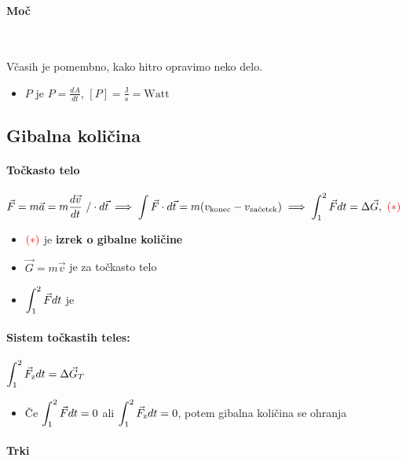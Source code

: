 \paragraph{Moč} \ 

Včasih je pomembno, kako hitro opravimo neko delo.

\begin{itemize}
    \item {} \(P\) je \(P = \frac{dA}{dt}\), \([P] = \frac{\text{J}}{\text{s}} = \text{Watt}\)
\end{itemize}

\subsection{Gibalna količina}
\paragraph{Točkasto telo}
\[\vec{F} = m \vec{a} = m \frac{d \vec{v}}{dt} \ / \cdot d \vec{t} \implies \int \vec{F} \cdot d \vec{t} = m(v_\text{konec} - v_\text{začetek}) \implies \int_{1}^{2}  \vec{F} dt = \Delta \vec{G}, \ \textcolor{red}{(*)}\]
\begin{itemize}
    \item \(\textcolor{red}{(*)}\) je \textbf{izrek o gibalne količine}
    \item \(\vec{G} = m \vec{v}\) je  za točkasto telo
    \item \(\displaystyle \int_{1}^{2} \vec{F} dt\) je 
\end{itemize}

\paragraph{Sistem točkastih teles: } \(\displaystyle \int_{1}^{2} \vec{F}_\text{z} dt = \Delta \vec{G}_T\)

\begin{itemize}
    \item Če \(\displaystyle \int_{1}^{2} \vec{F} dt = 0\) ali \(\displaystyle \int_{1}^{2} \vec{F}_\text{z} dt = 0\), potem gibalna količina se ohranja
\end{itemize}

\paragraph{Trki} \ 

